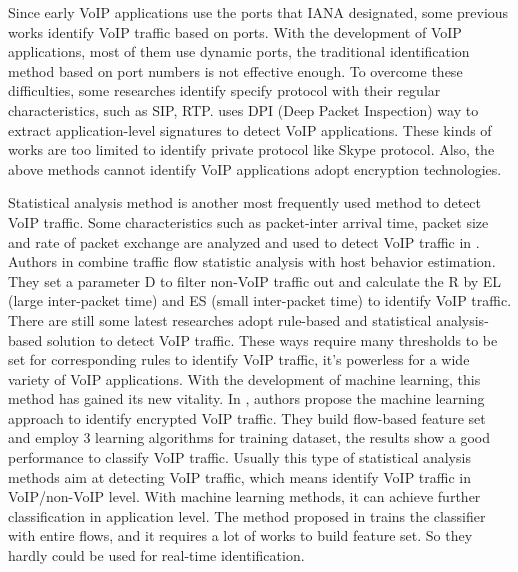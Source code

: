 \documentclass[conference]{IEEEtran}
\begin{document}

Since early VoIP applications use the ports that IANA designated, some previous works identify VoIP traffic based on ports. With the development of VoIP applications, most of them use dynamic ports, the traditional identification method based on port numbers is not effective enough. To overcome these difficulties, some researches \cite{14,16} identify specify protocol with their regular characteristics, such as SIP, RTP. \cite{18} uses DPI (Deep Packet Inspection) way to extract application-level signatures to detect VoIP applications. These kinds of works are too limited to identify private protocol like Skype protocol. Also, the above methods cannot identify VoIP applications adopt encryption technologies.

Statistical analysis method is another most frequently used method to detect VoIP traffic. Some characteristics such as packet-inter arrival time, packet size and rate of packet exchange are analyzed and used to detect VoIP traffic in \cite{2}. Authors in \cite{19} combine traffic flow statistic analysis with host behavior estimation. They set a parameter D to filter non-VoIP traffic out and calculate the R by EL (large inter-packet time) and ES (small inter-packet time) to identify VoIP traffic. There are still some latest researches \cite{20,21} adopt rule-based and statistical analysis-based solution to detect VoIP traffic. These ways require many thresholds to be set for corresponding rules to identify VoIP traffic, it's powerless for a wide variety of VoIP applications. With the development of machine learning, this method has gained its new vitality. In \cite{5}, authors propose the machine learning approach to identify encrypted VoIP traffic. They build flow-based feature set and employ 3 learning algorithms for training dataset, the results show a good performance to classify VoIP traffic. Usually this type of statistical analysis methods aim at detecting VoIP traffic, which means identify VoIP traffic in VoIP/non-VoIP level. With machine learning methods, it can achieve further classification in application level. The method proposed in \cite{5} trains the classifier with entire flows, and it requires a lot of works to build feature set. So they hardly could be used for real-time identification.
\end{document}
